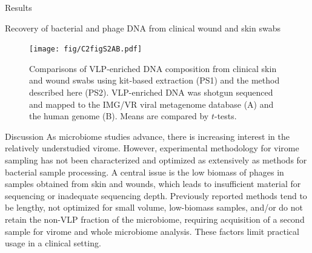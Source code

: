 \documentclass[oneside,12pt,final]{sty/ucthesis-CA2012}
\begin{document}
\begin{mainmatter}
\begin{section}{Results}
\begin{subsection}{Recovery of bacterial and phage DNA from clinical wound and skin swabs}
\begin{figure}
\centering
\texttt{[image: fig/C2figS2AB.pdf]}
\caption{Comparisons of VLP-enriched DNA composition from clinical skin and wound swabs using kit-based extraction (PS1) and the method described here (PS2). VLP-enriched DNA was shotgun sequenced and mapped to the IMG/VR viral metagenome database (A) and the human genome (B). Means are compared by $t$-tests.}
\label{fig:suppcomp}
\end{figure}

\end{subsection}

\end{section}

\begin{section}{Discussion}
As microbiome studies advance, there is increasing interest in the relatively understudied virome. However, experimental methodology for virome sampling has not been characterized and optimized as extensively as methods for bacterial sample processing. A central issue is the low biomass of phages in samples obtained from skin and wounds, which leads to insufficient material for sequencing or inadequate sequencing depth. Previously reported methods tend to be lengthy, not optimized for small volume, low-biomass samples, and/or do not retain the non-VLP fraction of the microbiome, requiring acquisition of a second sample for virome and whole
microbiome analysis. These factors limit practical usage in a clinical setting.


\end{section}
\end{mainmatter}
\end{document}
